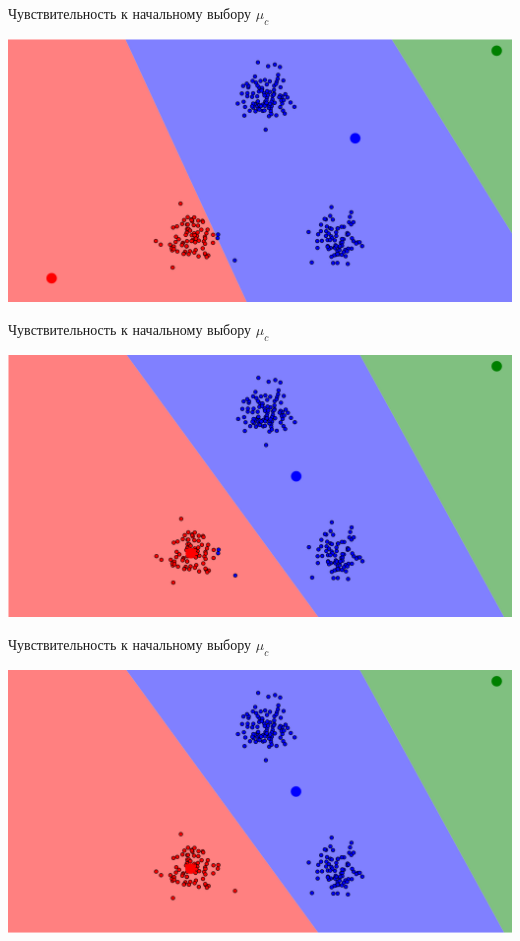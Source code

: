 \documentclass[10pt]{beamer}
\begin{document}
\begin{frame}{Чувствительность к начальному выбору $\mu_c$}
	\begin{center}
	  \includegraphics[width= \textwidth, keepaspectratio = true]{images/localmin1}  
	\end{center}
\end{frame}

\begin{frame}{Чувствительность к начальному выбору $\mu_c$}
	\begin{center}
	  \includegraphics[width= \textwidth, keepaspectratio = true]{images/localmin2}  
	\end{center}
\end{frame}

\begin{frame}{Чувствительность к начальному выбору $\mu_c$}
	\begin{center}
	  \includegraphics[width= \textwidth, keepaspectratio = true]{images/localmin3}  
	\end{center}
\end{frame}
\end{document}
